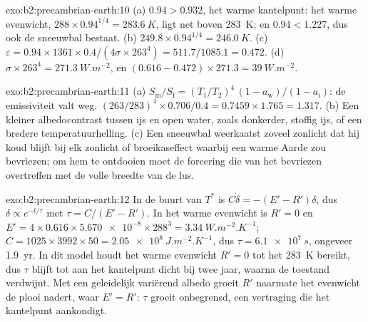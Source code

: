 \begin{solution}{exo:b2:precambrian-earth:10}
(a) $0.94 > 0.932$, het warme kantelpunt: het warme evenwicht, $288\times0.94^{1/4} =
\qty{283.6}{K}$, ligt net boven \qty{283}{K}; en $0.94 < 1.227$, dus ook de sneeuwbal bestaat.
(b) $249.8\times0.94^{1/4} = \qty{246.0}{K}$. (c) $\varepsilon = 0.94\times1361\times0.4/(4\sigma
\times263^4) = 511.7/1085.1 = 0.472$. (d) $\sigma\times263^4 = \qty{271.3}{W.m^{-2}}$, en $(0.616
- 0.472)\times271.3 = \qty{39}{W.m^{-2}}$.
\end{solution}

\begin{solution}{exo:b2:precambrian-earth:11}
(a) $S_{\text{m}}/S_{\text{f}} = (T_1/T_2)^4\,(1 - a_{\text{w}})/(1 - a_{\text{i}})$: de
emissiviteit valt weg. $(263/283)^4\times0.706/0.4 = 0.7459\times1.765 = 1.317$. (b) Een kleiner
albedocontrast tussen ijs en open water, zoals donkerder, stoffig ijs, of een bredere
temperatuurhelling. (c) Een sneeuwbal weerkaatst zoveel zonlicht dat hij koud blijft bij elk zonlicht of
broeikaseffect waarbij een warme Aarde zou bevriezen; om hem te ontdooien moet de forcering die van het
bevriezen overtreffen met de volle breedte van de lus.
\end{solution}

\begin{solution}{exo:b2:precambrian-earth:12}
In de buurt van $T^*$ is $C\dot\delta = -(E' - R')\delta$, dus $\delta \propto e^{-t/\tau}$ met $\tau =
C/(E' - R')$. In het warme evenwicht is $R' = 0$ en $E' = 4\times0.616\times\num{5.670e-8}\times
288^3 = \qty{3.34}{W.m^{-2}.K^{-1}}$; $C = 1025\times3992\times50 = \qty{2.05e8}{J.m^{-2}.K^{-1}}$,
dus $\tau = \qty{6.1e7}{s}$, ongeveer \qty{1.9}{yr}. In dit model houdt het warme evenwicht $R' =
0$ tot het \qty{283}{K} bereikt, dus $\tau$ blijft tot aan het kantelpunt dicht bij twee jaar, waarna
de toestand verdwijnt. Met een geleidelijk variërend albedo groeit $R'$ naarmate het evenwicht de
plooi nadert, waar $E' = R'$: $\tau$ groeit onbegrensd, een vertraging die het kantelpunt
aankondigt.
\end{solution}

